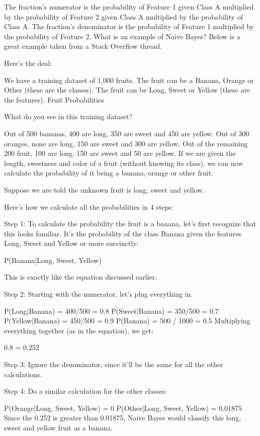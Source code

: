 The fraction’s numerator is the probability of Feature 1 given Class A multiplied by the probability of Feature 2 given Class A multiplied by the probability of Class A.
The fraction’s denominator is the probability of Feature 1 multiplied by the probability of Feature 2.
What is an example of Naive Bayes? Below is a great example taken from a Stack Overflow thread.

Here’s the deal:

We have a training dataset of 1,000 fruits.
The fruit can be a Banana, Orange or Other (these are the classes).
The fruit can be  Long, Sweet or Yellow (these are the features).
Fruit Probabilities

What do you see in this training dataset?

Out of 500 bananas, 400 are long, 350 are sweet and 450 are yellow.
Out of 300 oranges, none are long, 150 are sweet and 300 are yellow.
Out of the remaining 200 fruit, 100 are long, 150 are sweet and 50 are yellow.
If we are given the length, sweetness and color of a fruit (without knowing its class), we can now calculate the probability of it being a banana, orange or other fruit.

Suppose we are told the unknown fruit is long, sweet and yellow.

Here’s how we calculate all the probabilities in 4 steps:

Step 1: To calculate the probability the fruit is a banana, let’s first recognize that this looks familiar. It’s the probability of the class Banana given the features Long, Sweet and Yellow or more succinctly:

P(Banana|Long, Sweet, Yellow)

This is exactly like the equation discussed earlier.

Step 2: Starting with the numerator, let’s plug everything in.

P(Long|Banana) = 400/500 = 0.8
P(Sweet|Banana) = 350/500 = 0.7
P(Yellow|Banana) = 450/500 = 0.9
P(Banana) = 500 / 1000 = 0.5
Multiplying everything together (as in the equation), we get:

0.8    = 0.252

Step 3: Ignore the denominator, since it’ll be the same for all the other calculations.

Step 4: Do a similar calculation for the other classes:

P(Orange|Long, Sweet, Yellow) = 0
P(Other|Long, Sweet, Yellow) = 0.01875
Since the 0.252 is greater than 0.01875, Naive Bayes would classify this long, sweet and yellow fruit as a banana.

